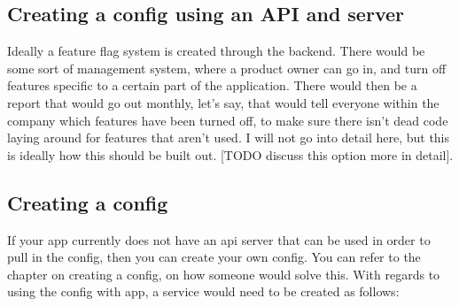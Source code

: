 \subsection{ Creating a config using an API and server }
Ideally a feature flag system is created through the backend. There would be
some sort of management system, where a product owner can go in, and turn off
features specific to a certain part of the application. There would then be a
report that would go out monthly, let's say, that would tell everyone within the
company which features have been turned off, to make sure there isn't dead code
laying around for features that aren't used. I will not go into detail here, but
this is ideally how this should be built out. [TODO discuss this option more in
detail].

\subsection{ Creating a config }
If your app currently does not have an api server that can be used in order to
pull in the config, then you can create your own config. You can refer to the
chapter on creating a config, on how someone would solve this. With regards to
using the config with app, a service would need to be created as follows:


